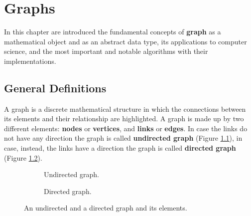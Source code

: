 \chapter{Graphs}
\label{chp:graphs}
In this chapter are introduced the fundamental concepts of \textbf{graph} as a mathematical object and as an abstract data type, its applications to computer science, and the most important and notable algorithms with their implementations. 
 
\section{General Definitions}
A graph is a discrete mathematical structure in which the connections between its elements and their relationship are highlighted. A graph is made up by two different elements: \textbf{nodes} or \textbf{vertices}, and \textbf{links} or \textbf{edges}. In case the links do not have any direction the graph is called \textbf{undirected graph} (Figure \ref{undirect_a}), in case, instead, the links have a direction the graph is called \textbf{directed graph} (Figure \ref{direct_b}).

\begin{figure}[H]
\centering
\begin{subfigure}[b]{0.4\linewidth}
\centering
{}
	\caption{Undirected graph.}
	\label{undirect_a}
\end{subfigure}
\hspace{1em}
\begin{subfigure}[b]{0.4\linewidth}
\centering
{}
	\caption{Directed graph.}
	\label{direct_b}
\end{subfigure}
\caption[An undirected and a directed graph and its elements.]{An undirected and a directed graph and its elements.}
\label{graph_1}
\end{figure}

